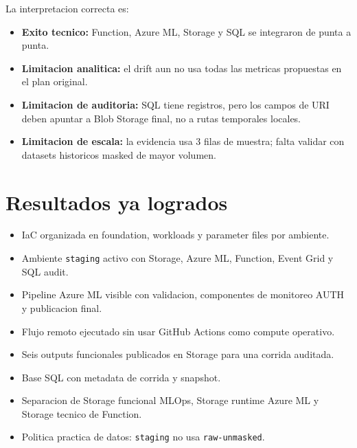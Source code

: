 \documentclass[11pt,letterpaper]{article}
\newcommand{\code}[1]{\texttt{\small #1}}
\begin{document}
La interpretacion correcta es:

\begin{itemize}[leftmargin=*]
  \item \textbf{Exito tecnico:} Function, Azure ML, Storage y SQL se integraron de punta a punta.
  \item \textbf{Limitacion analitica:} el drift aun no usa todas las metricas propuestas en el plan original.
  \item \textbf{Limitacion de auditoria:} SQL tiene registros, pero los campos de URI deben apuntar a Blob Storage final, no a rutas temporales locales.
  \item \textbf{Limitacion de escala:} la evidencia usa 3 filas de muestra; falta validar con datasets historicos masked de mayor volumen.
\end{itemize}

\section*{Resultados ya logrados}

\begin{itemize}[leftmargin=*]
  \item IaC organizada en foundation, workloads y parameter files por ambiente.
  \item Ambiente \code{staging} activo con Storage, Azure ML, Function, Event Grid y SQL audit.
  \item Pipeline Azure ML visible con validacion, componentes de monitoreo AUTH y publicacion final.
  \item Flujo remoto ejecutado sin usar GitHub Actions como compute operativo.
  \item Seis outputs funcionales publicados en Storage para una corrida auditada.
  \item Base SQL con metadata de corrida y snapshot.
  \item Separacion de Storage funcional MLOps, Storage runtime Azure ML y Storage tecnico de Function.
  \item Politica practica de datos: \code{staging} no usa \code{raw-unmasked}.
\end{itemize}
\end{document}
